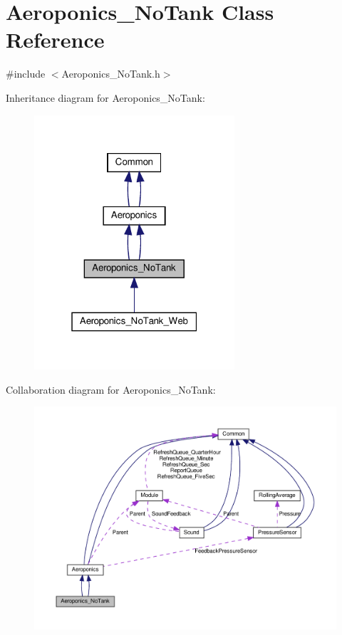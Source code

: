 \hypertarget{class_aeroponics___no_tank}{}\section{Aeroponics\+\_\+\+No\+Tank Class Reference}
\label{class_aeroponics___no_tank}


{\ttfamily \#include $<$Aeroponics\+\_\+\+No\+Tank.\+h$>$}



Inheritance diagram for Aeroponics\+\_\+\+No\+Tank\+:
\nopagebreak
\begin{figure}[H]
\begin{center}
\leavevmode
\includegraphics[width=211pt]{class_aeroponics___no_tank__inherit__graph}
\end{center}
\end{figure}


Collaboration diagram for Aeroponics\+\_\+\+No\+Tank\+:
\nopagebreak
\begin{figure}[H]
\begin{center}
\leavevmode
\includegraphics[width=350pt]{class_aeroponics___no_tank__coll__graph}
\end{center}
\end{figure}
